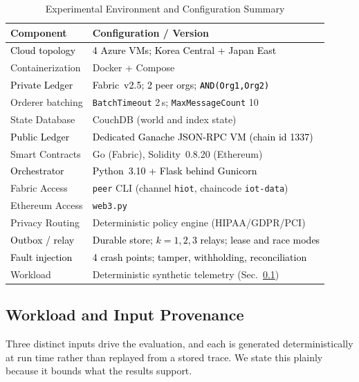 \documentclass[final,5p,times,twocolumn]{elsarticle}
\begin{document}
\begin{table}[!htbp]
\centering
\caption{Experimental Environment and Configuration Summary}
\label{tab:env}
\renewcommand{\arraystretch}{1.05}
\setlength{\tabcolsep}{3pt}
\scriptsize
\begin{tabular}{@{}p{}p{}@{}}
\toprule
\textbf{Component} & \textbf{Configuration / Version} \\ \midrule
\textcolor{black}{Cloud topology} & \textcolor{black}{4 Azure VMs; Korea Central + Japan East} \\
Containerization & Docker + Compose \\
\textcolor{black}{Private Ledger} & \textcolor{black}{Fabric~v2.5; 2 peer orgs; \texttt{AND(Org1,Org2)}} \\
Orderer batching & \texttt{BatchTimeout} 2\,s; \texttt{MaxMessageCount} 10 \\
State Database & CouchDB (world and index state) \\
\textcolor{black}{Public Ledger} & \textcolor{black}{Dedicated Ganache JSON-RPC VM (chain id 1337)} \\
Smart Contracts & Go (Fabric), Solidity~0.8.20 (Ethereum) \\
\textcolor{black}{Orchestrator} & \textcolor{black}{Python~3.10 + Flask behind Gunicorn} \\
Fabric Access & \texttt{peer} CLI (channel \texttt{hiot}, chaincode \texttt{iot-data}) \\
Ethereum Access & \texttt{web3.py} \\
Privacy Routing & Deterministic policy engine (HIPAA/GDPR/PCI) \\
\textcolor{black}{Outbox / relay} & \textcolor{black}{Durable store; $k=1,2,3$ relays; lease and race modes} \\
\textcolor{black}{Fault injection} & \textcolor{black}{4 crash points; tamper, withholding, reconciliation} \\
Workload & Deterministic synthetic telemetry (Sec.~\ref{sec:dataset}) \\
\bottomrule
\end{tabular}
\end{table}

\subsection{\textbf{Workload and Input Provenance}}
\label{sec:dataset}
Three distinct inputs drive the evaluation, and each is generated deterministically at run time rather than replayed from a stored trace. We state this plainly because it bounds what the results support.
\end{document}

